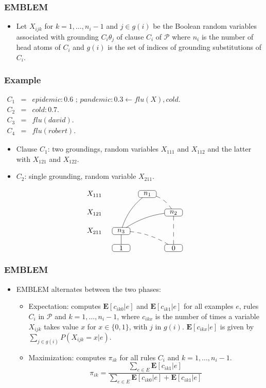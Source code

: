 \documentclass[trans,aspectratio=1610]{beamer}
\newcommand\orh{\mbox{ ; }}
\newcommand{\defpprog}{\ensuremath{\mathcal{P}}\xspace}
\newcommand{\lpif}{\leftarrow}
\begin{document}
\begin{frame}
 \frametitle{EMBLEM}
  \begin{itemize}
\item Let $X_{ijk}$ for $k=1,\ldots,n_i-1$ and $j\in g(i)$ be the Boolean random variables associated with grounding 
$C_i\theta_j$ of clause $C_i$ of $\defpprog$ where $n_i$ is the number of head atoms of $C_i$ and $g(i)$ is the set
of indices of grounding substitutions of $C_i$.
		\end{itemize}
\end{frame}
\begin{frame}
 \frametitle{Example}
 
$
 \begin{array}{lllllll}
C_1&=&epidemic:0.6\orh  pandemic :0.3\lpif flu(X),cold.\\
C_2&=&cold:0.7. \\
C_3&=&flu(david).\\
C_4&=&flu(robert).
 \end{array}$
\begin{itemize}
\item
Clause $C_1$: two groundings,  random variables $X_{111}$ and $X_{112}$ and the latter with $X_{121}$ and $X_{122}$.
 \item
 $C_2$:  single grounding, random variable
 $X_{211}$.
 \end{itemize}
 \begin{scriptsize}
	{
	$$
\xymatrix@=4mm
{ X_{111} & &*=<25pt,10pt>[F-:<3pt>]{n_1}
\ar@/_/@{-}[ldd] \ar@/^/@{--}[dr]\\ 
X_{121}  &&&*=<25pt,10pt>[F-:<3pt>]{n_2} 
\ar@/_/@{-}[dll]\ar@{--}[dd] 
\\
X_{211}& *=<25pt,10pt>[F-:<3pt>]{n_3}
\ar@{-}[d] \ar@/^/@{--}[drr]  && \\
&*=<25pt,10pt>[F-:<3pt>]{1} &&*=<25pt,10pt>[F-:<3pt>]{0}}
$$
}	
 \end{scriptsize}
\end{frame}
\begin{frame}
 \frametitle{EMBLEM}

  \begin{itemize}
\item 
EMBLEM alternates between the two phases:
\begin{itemize}
\item 
Expectation:
computes $\mathbf{E}[c_{ik0}|e]$ and $\mathbf{E}[c_{ik1}|e]$ for all examples $e$, rules $C_i$ in $\defpprog$ and $k=1,\ldots,n_i-1$, where $c_{ikx}$ is the number of times a variable $X_{ijk}$ takes value $x$ for $x\in \{0,1\}$, with $j$ in $g(i)$.
$\mathbf{E}[c_{ikx}|e]$ is given by $\sum_{j\in g(i)}P(X_{ijk}=x|e).$
\item
Maximization: computes $\pi_{ik}$ for all rules $C_i$ and $k=1,\ldots,n_i-1$.
$$\pi_{ik}=\frac{\sum_{e\in E}\mathbf{E}[c_{ik1}|e]}{\sum_{e\in E}\mathbf{E}[c_{ik0}|e]+\mathbf{E}[c_{ik1}|e]}$$
\end{itemize}
\end{itemize}
\end{frame}
\end{document}
